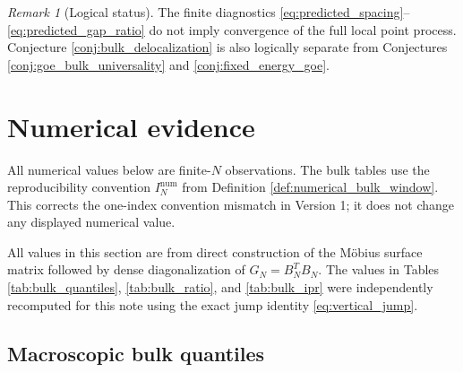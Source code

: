 \documentclass[11pt]{amsart}
\numberwithin{equation}{section}
\theoremstyle{plain}
\theoremstyle{definition}
\theoremstyle{remark}
\newtheorem{remark}[theorem]{Remark}
\begin{document}
\begin{remark}[Logical status]
\label{rem:not_equivalent_diagnostics}
The finite diagnostics \eqref{eq:predicted_spacing}--\eqref{eq:predicted_gap_ratio} do not imply convergence of the full local point process.  Conjecture \ref{conj:bulk_delocalization} is also logically separate from Conjectures \ref{conj:goe_bulk_universality} and \ref{conj:fixed_energy_goe}.
\end{remark}

\section{Numerical evidence}
\label{sec:numerical_evidence}

All numerical values below are finite-$N$ observations.  The bulk tables use the reproducibility convention $I_N^{\mathrm{num}}$ from Definition \ref{def:numerical_bulk_window}.  This corrects the one-index convention mismatch in Version 1; it does not change any displayed numerical value.

All values in this section are from direct construction of the M\"obius surface matrix followed by dense diagonalization of $G_N=B_N^TB_N$.  The values in Tables \ref{tab:bulk_quantiles}, \ref{tab:bulk_ratio}, and \ref{tab:bulk_ipr} were independently recomputed for this note using the exact jump identity \eqref{eq:vertical_jump}.

\subsection{Macroscopic bulk quantiles}
\label{subsec:bulk_quantiles}
\end{document}
